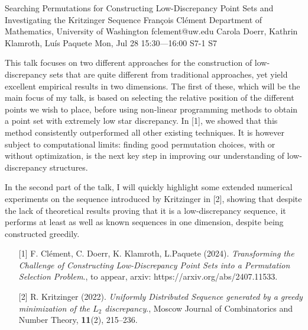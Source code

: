 \begin{talk}
  {Searching Permutations for Constructing Low-Discrepancy Point Sets and Investigating the Kritzinger Sequence}%
  {Fran\c{c}ois Cl\'{e}ment}%
  {Department of Mathematics, University of Washington}%
  {fclement@uw.edu}%
  {Carola Doerr, Kathrin Klamroth, Lu\'is Paquete}%
  {}%
  {Mon, Jul 28 15:30---16:00}%
  {S7-1}%
  {S7}%
  
    
   
This talk focuses on two different approaches for the construction of low-discrepancy sets that are quite different from traditional approaches, yet yield excellent empirical results in two dimensions. The first of these, which will be the main focus of my talk, is based on selecting the relative position of the different points we wish to place, before using non-linear programming methods to obtain a point set with extremely low star discrepancy. In [1], we showed that this method consistently outperformed all other existing techniques. It is however subject to computational limits: finding good permutation choices, with or without optimization, is the next key step in improving our understanding of low-discrepancy structures.

In the second part of the talk, I will quickly highlight some extended numerical experiments on the sequence introduced by Kritzinger in [2], showing that despite the lack of theoretical results proving that it is a low-discrepancy sequence, it performs at least as well as known sequences in one dimension, despite being constructed greedily. 

\medskip

\begin{enumerate}
 \item[{[1]}] F. Cl\'ement, C. Doerr, K. Klamroth, L.Paquete (2024). {\it Transforming the Challenge of Constructing Low-Discrepancy Point Sets into a Permutation Selection Problem}., to appear, arxiv: https://arxiv.org/abs/2407.11533.
 \item[{[2]}] R. Kritzinger (2022).  {\it Uniformly Distributed Sequence generated by a greedy minimization of the $L_2$ discrepancy}., Moscow Journal of Combinatorics and Number Theory, \textbf{11}(2), 215--236.
\end{enumerate}

\end{talk}


